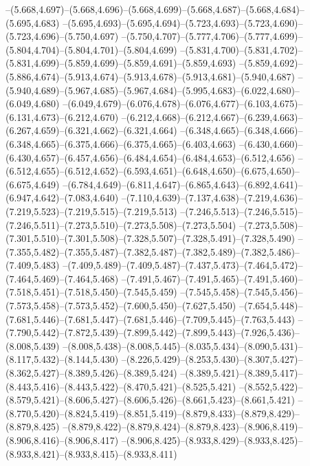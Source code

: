   --(5.668,4.697)--(5.668,4.696)--(5.668,4.699)--(5.668,4.687)--(5.668,4.684)--(5.695,4.683)%
  --(5.695,4.693)--(5.695,4.694)--(5.723,4.693)--(5.723,4.690)--(5.723,4.696)--(5.750,4.697)%
  --(5.750,4.707)--(5.777,4.706)--(5.777,4.699)--(5.804,4.704)--(5.804,4.701)--(5.804,4.699)%
  --(5.831,4.700)--(5.831,4.702)--(5.831,4.699)--(5.859,4.699)--(5.859,4.691)--(5.859,4.693)%
  --(5.859,4.692)--(5.886,4.674)--(5.913,4.674)--(5.913,4.678)--(5.913,4.681)--(5.940,4.687)%
  --(5.940,4.689)--(5.967,4.685)--(5.967,4.684)--(5.995,4.683)--(6.022,4.680)--(6.049,4.680)%
  --(6.049,4.679)--(6.076,4.678)--(6.076,4.677)--(6.103,4.675)--(6.131,4.673)--(6.212,4.670)%
  --(6.212,4.668)--(6.212,4.667)--(6.239,4.663)--(6.267,4.659)--(6.321,4.662)--(6.321,4.664)%
  --(6.348,4.665)--(6.348,4.666)--(6.348,4.665)--(6.375,4.666)--(6.375,4.665)--(6.403,4.663)%
  --(6.430,4.660)--(6.430,4.657)--(6.457,4.656)--(6.484,4.654)--(6.484,4.653)--(6.512,4.656)%
  --(6.512,4.655)--(6.512,4.652)--(6.593,4.651)--(6.648,4.650)--(6.675,4.650)--(6.675,4.649)%
  --(6.784,4.649)--(6.811,4.647)--(6.865,4.643)--(6.892,4.641)--(6.947,4.642)--(7.083,4.640)%
  --(7.110,4.639)--(7.137,4.638)--(7.219,4.636)--(7.219,5.523)--(7.219,5.515)--(7.219,5.513)%
  --(7.246,5.513)--(7.246,5.515)--(7.246,5.511)--(7.273,5.510)--(7.273,5.508)--(7.273,5.504)%
  --(7.273,5.508)--(7.301,5.510)--(7.301,5.508)--(7.328,5.507)--(7.328,5.491)--(7.328,5.490)%
  --(7.355,5.482)--(7.355,5.487)--(7.382,5.487)--(7.382,5.489)--(7.382,5.486)--(7.409,5.483)%
  --(7.409,5.489)--(7.409,5.487)--(7.437,5.473)--(7.464,5.472)--(7.464,5.469)--(7.464,5.468)%
  --(7.491,5.467)--(7.491,5.465)--(7.491,5.460)--(7.518,5.451)--(7.518,5.450)--(7.545,5.459)%
  --(7.545,5.458)--(7.545,5.456)--(7.573,5.458)--(7.573,5.452)--(7.600,5.450)--(7.627,5.450)%
  --(7.654,5.448)--(7.681,5.446)--(7.681,5.447)--(7.681,5.446)--(7.709,5.445)--(7.763,5.443)%
  --(7.790,5.442)--(7.872,5.439)--(7.899,5.442)--(7.899,5.443)--(7.926,5.436)--(8.008,5.439)%
  --(8.008,5.438)--(8.008,5.445)--(8.035,5.434)--(8.090,5.431)--(8.117,5.432)--(8.144,5.430)%
  --(8.226,5.429)--(8.253,5.430)--(8.307,5.427)--(8.362,5.427)--(8.389,5.426)--(8.389,5.424)%
  --(8.389,5.421)--(8.389,5.417)--(8.443,5.416)--(8.443,5.422)--(8.470,5.421)--(8.525,5.421)%
  --(8.552,5.422)--(8.579,5.421)--(8.606,5.427)--(8.606,5.426)--(8.661,5.423)--(8.661,5.421)%
  --(8.770,5.420)--(8.824,5.419)--(8.851,5.419)--(8.879,8.433)--(8.879,8.429)--(8.879,8.425)%
  --(8.879,8.422)--(8.879,8.424)--(8.879,8.423)--(8.906,8.419)--(8.906,8.416)--(8.906,8.417)%
  --(8.906,8.425)--(8.933,8.429)--(8.933,8.425)--(8.933,8.421)--(8.933,8.415)--(8.933,8.411)%
